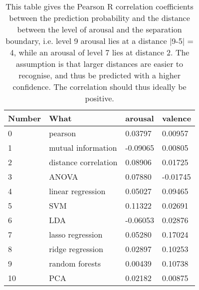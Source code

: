 \begin{table}[H]
\centering
\caption{This table gives the Pearson R correlation coefficients between the prediction probability and the distance between the level of arousal and the separation boundary, i.e. level 9 arousal lies at a distance |9-5| = 4, while an arousal of level 7 lies at distance 2. The assumption is that larger distances are easier to recognise, and thus be predicted with a higher confidence. The correlation should thus ideally be positive\label{corrsCompLbl}.}
\begin{tabular}{llll}
\textbf{Number} & \textbf{What}        & \textbf{arousal} & \textbf{valence}  \\ \hline
0               & pearson              & 0.03797          & 0.00957  \\
1               & mutual information   & -0.09065         & 0.00805  \\
2               & distance correlation & 0.08906          & 0.01725  \\
3               & ANOVA                & 0.07880          & -0.01745 \\
4               & linear regression    & 0.05027          & 0.09465  \\
5               & SVM                  & 0.11322          & 0.02691  \\
6               & LDA                  & -0.06053         & 0.02876  \\
7               & lasso regression     & 0.05280          & 0.17024  \\
8               & ridge regression     & 0.02897          & 0.10253  \\
9               & random forests       & 0.00439          & 0.10738  \\
10              & PCA                  & 0.02182          & 0.00875 
\end{tabular}
\end{table}



